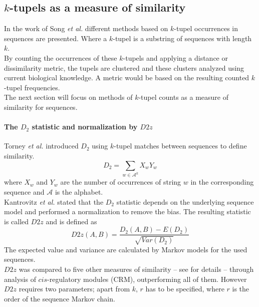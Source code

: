 \documentclass[twocolumn]{bmcart}%
\begin{document}
\subsection*{$k$-tupels as a measure of similarity}
In the work of Song \textit{et al.}\cite{doi:10.1093/bib/bbt067} different methods based on $k$-tupel occurrences in sequences are presented. Where a $k$-tupel is a substring of sequences with length $k$.\\
By counting the occurrences of these $k$-tupels and applying a distance or dissimilarity metric, the tupels are clustered and these clusters analyzed using current biological knowledge. A metric would be based on the resulting counted $k$-tupel frequencies.\\
The next section will focus on methods of $k$-tupel counts as a measure of similarity for sequences.
\paragraph*{The $D_2$ statistic and normalization by $D2z$}
Torney \textit{et al.}\cite{torney1990computation} introduced $D_2$  using $k$-tupel matches between sequences to define similarity.
$$D_2=\sum_{w\in \mathcal{A}^k}X_wY_w$$
where $X_w$ and $Y_w$ are the number of occurrences of string $w$ in the corresponding sequence and $ \mathcal{A}$ is the alphabet.\\
Kantrovitz \textit{et al.}\cite{kantorovitz2007statistical} stated that the $D_2$ statistic depends on the  underlying sequence model and performed a normalization to remove the bias. The resulting statistic is called $D2z$ and is defined as
$$D2z(A,B)=\frac{D_2(A,B)-E(D_2)}{\sqrt{Var(D_2)}}$$
The expected value and variance are calculated by Markov models for the used sequences.\\
$D2z$ was compared to five other measures of similarity -- see \cite{doi:10.1093/bib/bbt067,kantorovitz2007statistical} for details -- through analysis of $cis$-regulatory modules (CRM), outperforming all of them. However $D2z$ requires two parameters; apart from $k$, $r$ has to be specified, where $r$ is the order of the sequence Markov chain.
\end{document}
